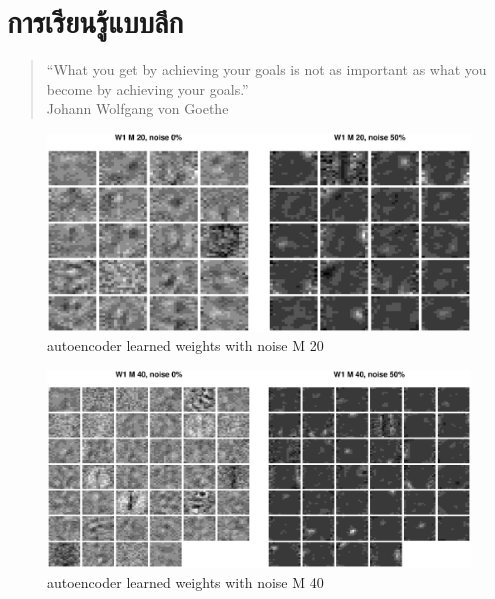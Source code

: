 \chapter{การเรียนรู้แบบลึก}
\label{chapter: ANN deep learning}

\begin{verse}
``What you get by achieving your goals is not as important as what you become by achieving your goals.'' \\
Johann Wolfgang von Goethe
\end{verse}


%
\begin{figure}
\begin{center}
\includegraphics[width=6in]{04ANNDeep/ae01WplotsA.eps}
\end{center}
\caption{autoencoder learned weights with noise M 20}
\label{fig: deep autoencoder learned weights with noise M 20}
\end{figure}
%

%
\begin{figure}
\begin{center}
\includegraphics[width=6in]{04ANNDeep/ae01WplotsB.eps}
\end{center}
\caption{autoencoder learned weights with noise M 40}
\label{fig: deep autoencoder learned weights with noise M 40}
\end{figure}
%

